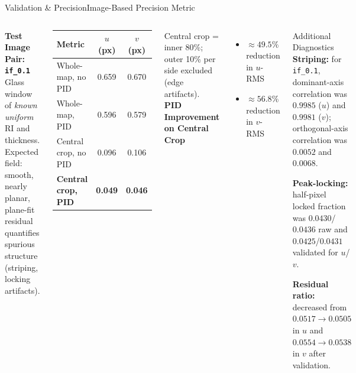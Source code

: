 \documentclass[9pt, aspectratio=169]{beamer}
\newcommand{\theadrow}{\rowcolor{accentlight}}
\begin{document}
\begin{frame}{Validation \& Precision}{Image-Based Precision Metric}
  \begin{columns}[t]
      \textbf{Test Image Pair: \texttt{if\_0.1}}\\
      Glass window of \emph{known uniform} RI and thickness. Expected field: smooth, nearly planar, plane-fit residual quantifies spurious structure (striping, locking artifacts).

      \vspace{0.3em}
      \begin{center}
        \small
        \begin{tabular}{lcc}
          \toprule
          \theadrow Metric & $u$ (px) & $v$ (px) \\
          \midrule
          Whole-map, no PID    & 0.659 & 0.670 \\
          Whole-map, PID       & 0.596 & 0.579 \\
          Central crop, no PID & 0.096 & 0.106 \\
          \textbf{Central crop, PID} & \textbf{0.049} & \textbf{0.046} \\
          \bottomrule
        \end{tabular}
      \end{center}
      \small Central crop = inner 80\%; outer 10\% per side excluded (edge artifacts).
      \textbf{PID Improvement on Central Crop}
      \begin{itemize}
        \item $\approx\mathbf{49.5\%}$ reduction in $u$-RMS
        \item $\approx\mathbf{56.8\%}$ reduction in $v$-RMS
      \end{itemize}
      \vspace{0.3em}
      \begin{block}{Additional Diagnostics}
        \textbf{Striping:} for \texttt{if\_0.1}, dominant-axis correlation was $0.9985$ ($u$) and $0.9981$ ($v$); orthogonal-axis correlation was $0.0052$ and $0.0068$.
    
        \vspace{0.25em}
        \textbf{Peak-locking:} half-pixel locked fraction was $0.0430$/$0.0436$ raw and $0.0425$/$0.0431$ validated for $u$/$v$.
    
        \vspace{0.25em}
        \textbf{Residual ratio:} decreased from $0.0517 \rightarrow 0.0505$ in $u$ and $0.0554 \rightarrow 0.0538$ in $v$ after validation.
      \end{block}

  \end{columns}
\end{frame}
\end{document}
